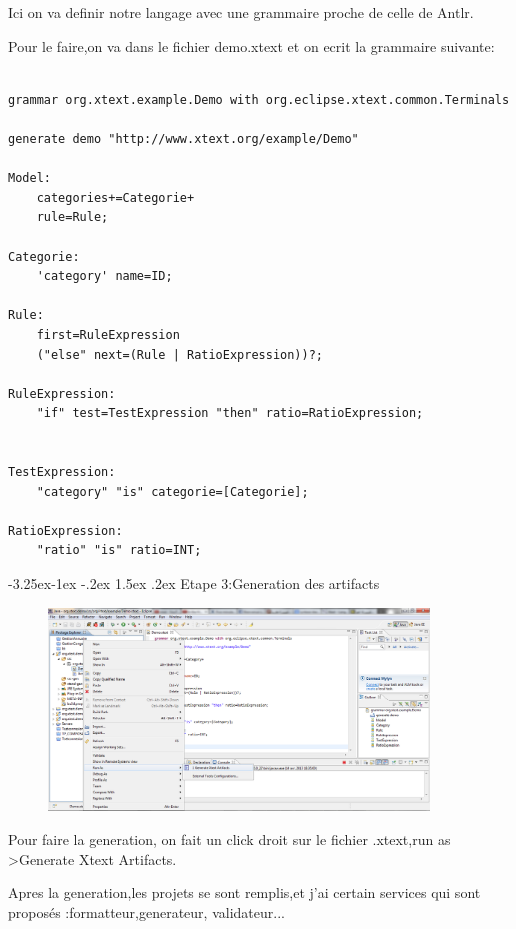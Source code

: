 \documentclass{article}
\makeatletter
\newcounter {subsubsubsection}[subsubsection]
\newcommand\subsubsubsection{\@startsection{subsubsubsection}{4}{\z@}%
                                     {-3.25ex\@plus -1ex \@minus -.2ex}%
                                     {1.5ex \@plus .2ex}%
                                     {\normalfont\normalsize\bfseries}}
\makeatother
\begin{document}
{Ici on va definir notre langage  avec une grammaire proche de celle de Antlr.

Pour le faire,on va dans le fichier demo.xtext et on ecrit la grammaire suivante:

\begin{verbatim}

grammar org.xtext.example.Demo with org.eclipse.xtext.common.Terminals

generate demo "http://www.xtext.org/example/Demo"

Model:
	categories+=Categorie+
	rule=Rule;
	
Categorie:
	'category' name=ID;
	
Rule:
	first=RuleExpression
	("else" next=(Rule | RatioExpression))?;

RuleExpression:
	"if" test=TestExpression "then" ratio=RatioExpression;


TestExpression:
	"category" "is" categorie=[Categorie];

RatioExpression:
	"ratio" "is" ratio=INT;

\end{verbatim}




 \subsubsubsection{Etape 3:Generation des artifacts}

\newpage




\begin{figure}[h]
	\centering
		\includegraphics[width=0.90\textwidth]{3.PNG}
	\label{fig:3}
\end{figure}



Pour faire la generation, on fait un click droit sur le fichier .xtext,run as >Generate Xtext Artifacts.

Apres la generation,les projets se sont remplis,et j'ai certain services qui sont proposés :formatteur,generateur, validateur...


}
\end{document}
